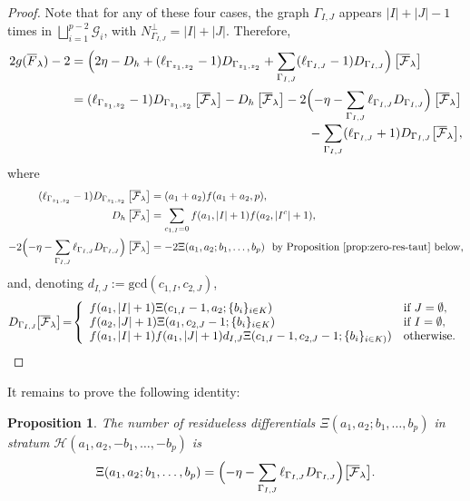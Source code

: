 \documentclass[JEP,XML,SOM,Unicode,NoFloatCountersInSection,published]{cedram}
\newtheorem{prop}[thm]{Proposition}
\theoremstyle{definition}
\begin{document}
\begin{proof}
Note that for any of these four cases, the graph $\Gamma_{I,J}$ appears $|I|+|J|-1$ times in $\bigsqcup_{i=1}^{p-2}\mathcal{G}_i$, with $N_{\Gamma_{I,J}}^\bot=|I|+|J|$. Therefore,
\begin{align*}
2g (\overline{F}_\lambda)-2 & = \Bigl( 2\eta -D_h + (\ell_{\Gamma_{z_1,z_2}}-1)D_{\Gamma_{z_1,z_2}} +\sum_{\Gamma_{I,J}}(\ell_{\Gamma_{I,J}}-1)D_{\Gamma_{I,J}} \Bigr)\left[\overline{\mathcal F}_\lambda\right]\\
& = (\ell_{\Gamma_{z_1,z_2}}-1)D_{\Gamma_{z_1,z_2}}\left[\overline{\mathcal F}_\lambda\right] - D_h\left[\overline{\mathcal F}_\lambda\right]-2\Bigl(-\eta-\sum_{\Gamma_{I,J}}\ell_{\Gamma_{I,J}}D_{\Gamma_{I,J}}\Bigr)\left[\overline{\mathcal F}_\lambda\right]\\[-3pt]
&\hspace*{6.6cm} -\sum_{\Gamma_{I,J}}(\ell_{\Gamma_{I,J}}+1)D_{\Gamma_{I,J}}\bigl[\overline{\mathcal F}_\lambda\bigr],
\end{align*}
where
\begin{align*}
(\ell_{\Gamma_{z_1,z_2}}-1)D_{\Gamma_{z_1,z_2}}\left[\overline{\mathcal F}_\lambda\right] & = (a_1+a_2)f(a_1+a_2,p),\\
D_h \left[\overline{\mathcal F}_\lambda\right] & = \sum_{c_{1,I}=0} f(a_1,|I|+1)f(a_2,|I^c|+1),\\
-2\Bigl(-\eta-\sum_{\Gamma_{I,J}} \ell_{\Gamma_{I,J}} D_{\Gamma_{I,J}}\Bigr)\left[\overline{\mathcal F}_\lambda\right] & = -2 \Xi(a_1,a_2; b_1,\ldots, b_p) \ \ \text{by Proposition \ref{prop:zero-res-taut} below,}
\end{align*}
and, denoting $d_{I,J}:=\text{gcd}(c_{1,I},c_{2,J})$,
\begin{equation*}
D_{\Gamma_{I,J}}\mkern-2mu \bigl[\overline{\mathcal F}_\lambda\bigr] \!=\!
\left\{
\begin{array}{ll}
f(a_1,|I|+1)\Xi(c_{1,I}-1,a_2;\{b_i\}_{i\in K}) & \text{if } J=\emptyset,\\
f(a_2,|J|+1)\Xi(a_1,c_{2,J}-1;\{b_i\}_{i\in K}) & \text{if } I=\emptyset,\\
f(a_1,|I|+1)f(a_1,|J|+1)d_{I,J}\Xi(c_{1,I}-1,c_{2,J}-1;\{b_i\}_{i\in K)}) & \text{otherwise.}
\end{array}\right.
\end{equation*}
\end{proof}
It remains to prove the following identity:

\begin{prop}
\label{prop:zero-res-taut}
The number of residueless differentials $\Xi(a_1,a_2;b_1,\ldots,b_p)$ in stratum $\mathcal{H}(a_1, a_2, -b_1,\ldots, -b_p)$ is
\begin{equation}
\label{eqn:zero-res-taut}
\Xi(a_1,a_2;b_1,\ldots,b_p)=\Bigl(-\eta-\sum_{\Gamma_{I,J}}\ell_{\Gamma_{I,J}} D_{\Gamma_{I,J}}\Bigr)\bigl[\overline{\mathcal{F}}_{\lambda}\bigr].
\end{equation}
\end{prop}
\end{document}
